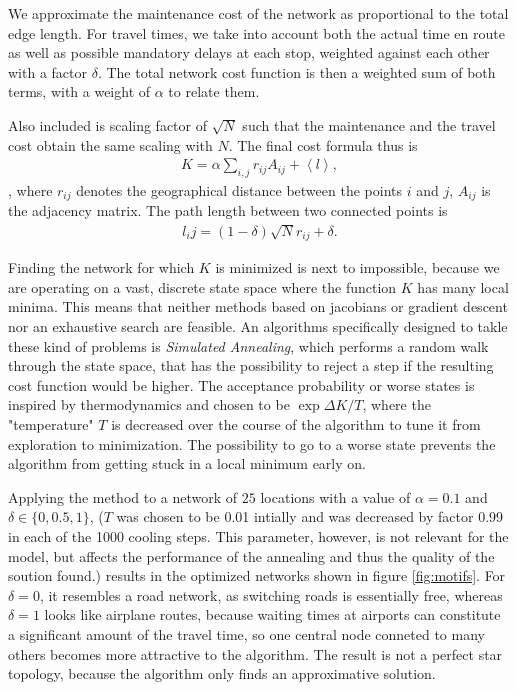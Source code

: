\documentclass{scrartcl}
\begin{document}
We approximate the maintenance cost of the network as proportional to the
total edge length. For travel times, we take into account both the actual
time en route as well as possible mandatory delays at each stop, weighted
against each other with a factor $\delta$. The total network cost function
is then a weighted sum of both terms, with a weight of $\alpha$ to relate
them.  

Also included is scaling factor of $\sqrt{N}$ such that the maintenance and
the travel cost obtain the same scaling with $N$. The final cost formula
thus is
\begin{align}
 K = \alpha \sum_{i,j} r_{ij} A_{ij} + \left< l \right>,
\end{align}, where $r_{ij}$ denotes the geographical distance between the points $i$ and $j$, $A_{ij}$ is the adjacency matrix.
The path length between two connected points is 
\begin{align}
 l_ij = (1-\delta) \sqrt{N} r_{ij} + \delta.
\end{align}
 
Finding the network for which $K$ is minimized is next to impossible,
because we are operating on a vast, discrete state space where the function
$K$ has many local minima. This means that neither methods based on
jacobians or gradient descent nor an exhaustive search are feasible. 
An algorithms specifically designed to takle these kind of problems is
\emph{Simulated Annealing}, which performs a random walk through the state space,
that has the possibility to reject a step if the resulting cost function
would be higher. The acceptance probability or worse states is inspired by thermodynamics
and chosen to be $\exp \Delta K/T$, where the "temperature" $T$ is
decreased over the course of the algorithm to tune it from exploration to
minimization. The possibility to go to a worse state prevents the algorithm
from getting stuck in a local minimum early on.

Applying the method to a network of $25$ locations with a value of
$\alpha=0.1$ and $\delta \in \{0, 0.5, 1\}$, ($T$ was chosen to be 0.01
intially and was decreased by factor 0.99 in each of the 1000 cooling steps.
This parameter, however, is not relevant for the model, but affects the
performance of the annealing and thus the quality of the soution found.)
results in the optimized networks shown in figure \ref{fig:motifs}. For
$\delta=0$, it resembles a road network, as switching roads is essentially
free, whereas $\delta=1$ looks like airplane routes, because waiting times
at airports can constitute a significant amount of the travel time, so one 
central node conneted to many others becomes more attractive to the algorithm.
The result is not a perfect star topology, because the algorithm only finds
an approximative solution.
\end{document}
